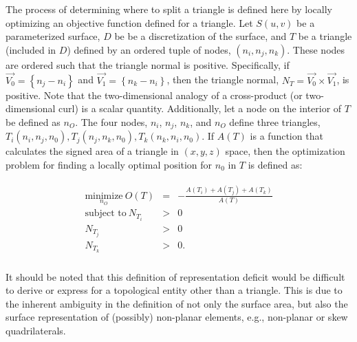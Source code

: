 The process of determining where to split a triangle is defined here by
locally optimizing an objective function defined for a triangle.  Let
$S(u,v)$ be a parameterized surface, $D$ be be a discretization of the
surface, and $T$ be a triangle (included in $D$) defined by an ordered
tuple of nodes, $\left(n_i, n_j, n_k\right)$. These nodes are ordered
such that the triangle normal is positive. Specifically, if $\vec{V_0} =
\left\{n_j - n_i \right\}$ and $\vec{V_1} = \left\{n_k - n_i\right\}$, 
then the triangle normal, $N_T = \vec{V_0} \times \vec{V_1}$, is
positive. Note that the two-dimensional analogy of a cross-product (or 
two-dimensional curl) is a scalar quantity. Additionally, let a node on 
the interior of $T$ be defined as $n_O$. The four nodes, $n_i$, $n_j$, 
$n_k$, and $n_O$
define three triangles, $T_i\left(n_i,n_j,n_0\right), T_j\left(n_j, n_k,
n_0\right), T_k\left(n_k, n_i, n_0\right)$. If $A(T)$ is a function
that calculates the signed area of a triangle in $\left(x,y,z\right)$ space,
then the optimization problem for finding a locally optimal position for 
$n_0$ in $T$ is defined as:

\begin{eqnarray*}
\begin{array}{rcl}
\underset{n_O}{\text{minimize}} \ O(T) & = & - \frac{A\left(T_i\right) + A\left(T_j\right) + A\left(T_k\right) }{ A\left(T\right) }\\
\text{subject to} \ N_{T_i} & > & 0 \\
N_{T_j} & > & 0 \\ 
N_{T_k} & > & 0. \\
\end{array}
\end{eqnarray*}

It should be noted that this definition of representation deficit would
be difficult to derive or express for a topological entity other than a
triangle. This is due to the inherent ambiguity in the definition of not
only the surface area, but also the surface representation of (possibly)
non-planar elements, e.g., non-planar or skew quadrilaterals.
